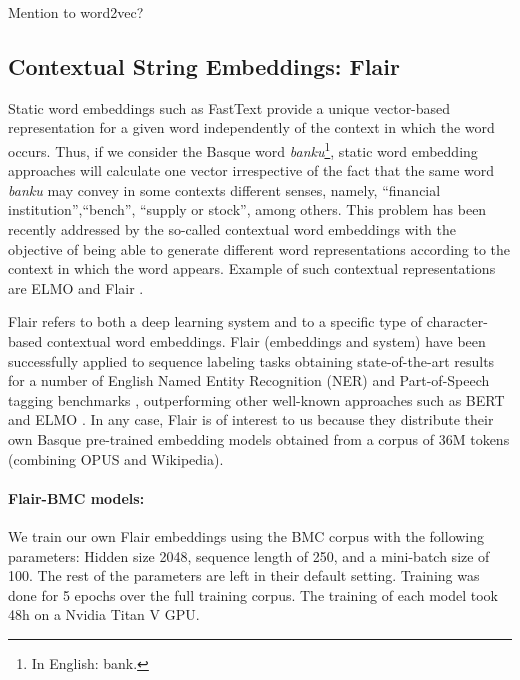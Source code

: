 \documentclass[10pt, a4paper]{article}
\begin{document}
Mention to word2vec?


\subsection{Contextual String Embeddings: Flair}\label{sec:build-basq-models:flair}

Static word embeddings such as FastText \cite{fasttext1_bojanowski2017enriching} provide a unique vector-based representation for a given word independently of the context in which the word occurs. Thus, if we consider the Basque word \emph{banku}\footnote{In English: bank.}, static word embedding approaches will calculate one vector irrespective of the fact that the same word \emph{banku} may convey in some contexts different senses, namely, ``financial institution'',``bench'', ``supply or stock'', among others. This problem has been recently addressed by the so-called contextual word embeddings with the objective of being able to generate different word representations according to the context in which the word appears. Example of such contextual representations are ELMO \cite{Peters:2018} and Flair \cite{akbik2018coling}.

Flair refers to both a deep learning system and to a specific type of character-based contextual word embeddings. Flair (embeddings and system) have been successfully applied to sequence labeling tasks obtaining state-of-the-art results for a number of English Named Entity Recognition (NER) and Part-of-Speech tagging benchmarks \cite{akbik2018coling}, outperforming other well-known approaches such as BERT and ELMO \cite{devlin2019bert,Peters:2018}. In any case, Flair is of interest to us because they distribute their own Basque pre-trained embedding models obtained from a corpus of 36M tokens (combining OPUS and Wikipedia).

\paragraph{Flair-BMC models:} We train our own Flair embeddings using the BMC corpus with the following parameters: Hidden size 2048, sequence length of 250, and a mini-batch size of 100. The rest of the parameters are left in their default setting. Training was done for 5 epochs over the full training corpus. The training of each model took 48h on a Nvidia Titan V GPU.
\end{document}

